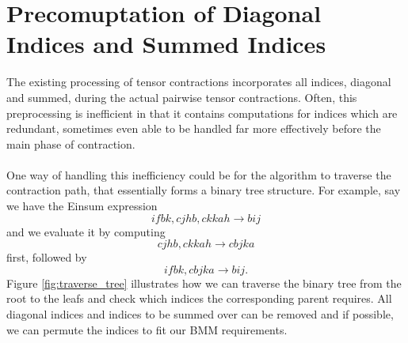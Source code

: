 \section{Precomuptation of Diagonal Indices and Summed Indices}
The existing processing of tensor contractions incorporates all indices, diagonal and summed,
during the actual pairwise tensor contractions. Often, this preprocessing is inefficient in
that it contains computations for indices which are redundant, sometimes even able to be
handled far more effectively before the main phase of contraction.
\\
\\
One way of handling this inefficiency could be for the algorithm to traverse the contraction
path, that essentially forms a binary tree structure. For example, say we have the Einsum
expression
\begin{equation*}
    ifbk, cjhb, ckkah \rightarrow bij
\end{equation*}
and we evaluate it by computing
\begin{equation*}
    cjhb, ckkah \rightarrow cbjka
\end{equation*}
first, followed by
\begin{equation*}
    ifbk, cbjka \rightarrow bij.
\end{equation*}
Figure \ref{fig:traverse_tree} illustrates how we can traverse the binary tree from the root to the leafs and
check which indices the corresponding parent requires. All diagonal indices and indices to be
summed over can be removed and if possible, we can permute the indices to fit our BMM requirements.
\\
\\

